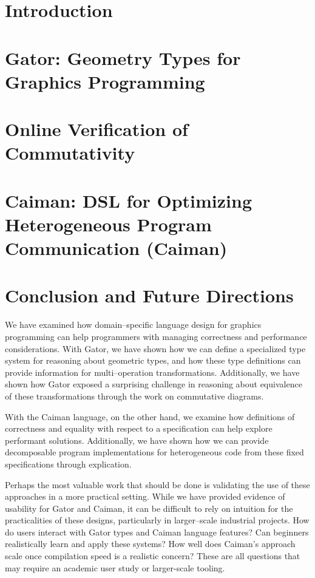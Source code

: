 \documentclass[phd,tocprelim]{cornell}
\begin{document}
\chapter{Introduction}



\chapter{Gator: Geometry Types for Graphics Programming}



\chapter{Online Verification of Commutativity}



\chapter{Caiman: DSL for Optimizing Heterogeneous Program Communication (Caiman)}



\chapter{Conclusion and Future Directions}

We have examined how domain--specific language design for graphics programming can help programmers with managing correctness and performance considerations.  With Gator, we have shown how we can define a specialized type system for reasoning about geometric types, and how these type definitions can provide information for multi--operation transformations.  Additionally, we have shown how Gator exposed a surprising challenge in reasoning about equivalence of these transformations through the work on commutative diagrams.

With the Caiman language, on the other hand, we examine how definitions of correctness and equality with respect to a specification can help explore performant solutions.  Additionally, we have shown how we can provide decomposable program implementations for heterogeneous code from these fixed specifications through explication.

Perhaps the most valuable work that should be done is validating the use of these approaches in a more practical setting.  While we have provided evidence of usability for Gator and Caiman, it can be difficult to rely on intuition for the practicalities of these designs, particularly in larger--scale industrial projects.  How do users interact with Gator types and Caiman language features?  Can beginners realistically learn and apply these systems?  How well does Caiman's approach scale once compilation speed is a realistic concern?  These are all questions that may require an academic user study or larger-scale tooling.
\end{document}
